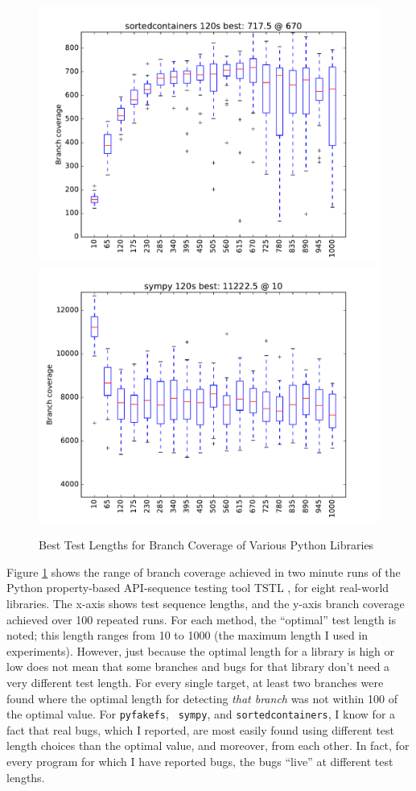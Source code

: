 \documentclass[sigplan,review]{acmart}
\begin{document}
\begin{figure}
\includegraphics[width=0.9\columnwidth]{graphs/sortedcontainersrand120}
\includegraphics[width=0.9\columnwidth]{graphs/sympyrand120}
\caption{Best Test Lengths for Branch Coverage of Various Python
  Libraries}
\label{fig:length}

\end{figure}

Figure \ref{fig:length} shows the range of branch coverage achieved in
two minute runs of the Python property-based API-sequence testing tool
TSTL \cite{tstlsttt}, for
eight real-world libraries.  The x-axis shows test sequence lengths,
and the y-axis branch coverage achieved over 100 repeated runs.  For
each method, the ``optimal'' test length is noted; this length ranges
from 10 to 1000 (the maximum length I used in experiments).  However,
just because the optimal length for a library is high or low does not
mean that some branches and bugs for that library don't need a very
different test length.  For every single target, at least two branches
were found where the optimal length for detecting \emph{that branch}
was not within 100 of the optimal value.  For {\tt pyfakefs}, {\tt
  sympy}, and {\tt sortedcontainers}, I know for a fact that real
bugs, which I reported, are most easily found using different test
length choices than the optimal value, and moreover, from each other.
In fact, for every program for which I have reported bugs, the bugs
``live'' at different test lengths.
\end{document}

